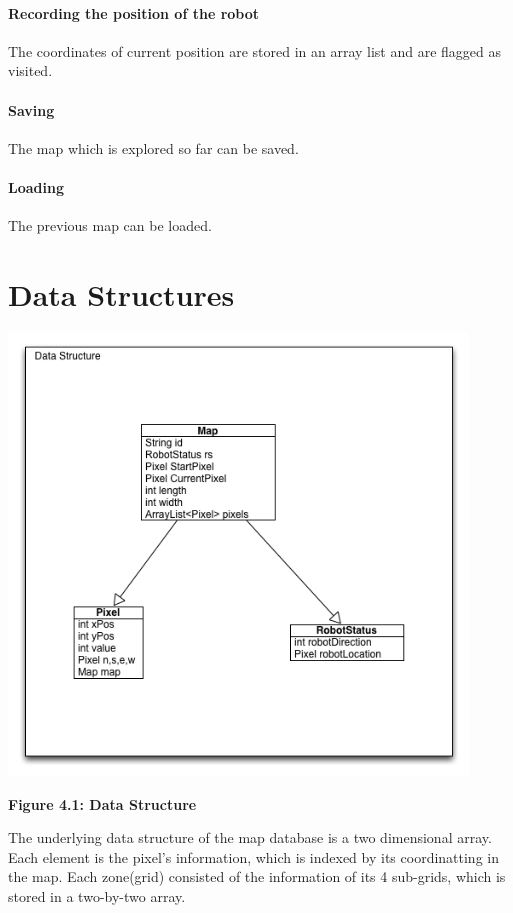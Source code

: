 \documentclass[11pt, a4paper]{report}
\begin{document}
\paragraph{Recording the position of the robot}

The coordinates of current position are stored in an array list and are flagged as visited.

\paragraph{Saving}

The map which is explored so far can be saved.

\paragraph{Loading}

The previous map can be loaded.


\section{Data Structures}
 \begin{center}
 \includegraphics[width=12.20cm]{DataStructures.png}
\end{center}
\begin{center}
\textbf {Figure 4.1: Data Structure} \\[0.3cm]
\end{center}
The underlying data structure of the map database is a two dimensional array. Each element
is the pixel's information, which is indexed by its coordinatting in the map. Each zone(grid)
consisted of the information of its 4 sub-grids, which is stored in a two-by-two array.
\end{document}

